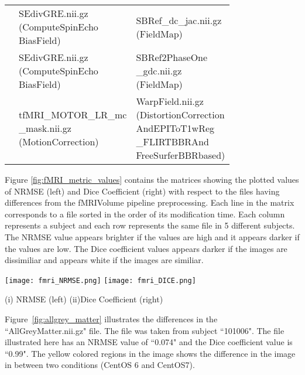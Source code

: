 \begin{center}
\begin{longtable}{|p{}|p{}|p{}|}
& \makecell[l]{SEdivGRE.nii.gz\\(ComputeSpinEcho\\BiasField)}                         & \makecell[l]{SBRef\_dc\_jac.nii.gz\\(FieldMap)} \\\cline{2-3}
& \makecell[l]{SEdivGRE.nii.gz\\(ComputeSpinEcho\\BiasField)}                         & \makecell[l]{SBRef2PhaseOne\\\_gdc.nii.gz\\(FieldMap)} \\\cline{2-3}
& \makecell[l]{tfMRI\_MOTOR\_LR\_mc\\\_mask.nii.gz\\(MotionCorrection)}               & \makecell[l]{WarpField.nii.gz\\(DistortionCorrection\\AndEPIToT1wReg\\\_FLIRTBBRAnd\\FreeSurferBBRbased)} \\\cline{1-3}
\end{longtable}
\label{tab:fMRIVolume_comparison_table}
\end{center}
\hfill \break
\fi

Figure \ref{fig:fMRI_metric_values} contains the matrices showing the plotted values of NRMSE (left) and Dice Coefficient (right) with respect to the files having differences from the fMRIVolume pipeline preprocessing. Each line in the matrix corresponds to a file sorted in the order of its modification time. Each column represents a subject and each row represents the same file in 5 different subjects. The NRMSE value appears brighter if the values are high and it appears darker if the values are low. The Dice coefficient values appears darker if the images are dissimiliar and appears white if the images are similiar.

\hfill \break
\begin{center}
\texttt{[image: fmri\_NRMSE.png]}%
\texttt{[image: fmri\_DICE.png]}
\caption*{(i) NRMSE (left) (ii)Dice Coefficient (right)}
\label{fig:fMRI_metric_values}
\end{center}
\hfill \break

Figure~\ref{fig:allgrey_matter} illustrates the differences in the ``AllGreyMatter.nii.gz" file. The file was taken from subject ``101006". The file illustrated here has an NRMSE value of ``0.074" and the Dice coefficient value is ``0.99". The yellow colored regions in the image shows the difference in the image in between two conditions (CentOS 6 and CentOS7).

